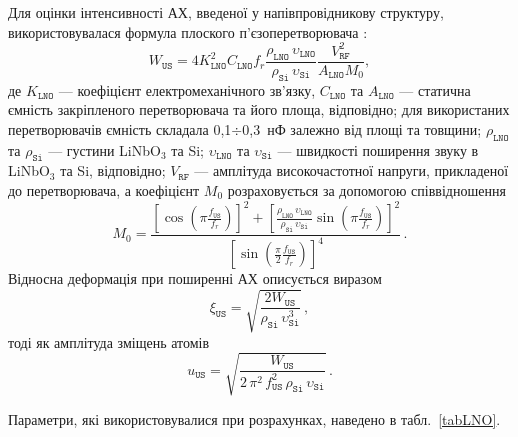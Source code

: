 Для оцінки інтенсивності АХ, введеної у напівпровідникову структуру, використовувалася формула плоского п’єзоперетворювача \cite{WusBook}:
 \begin{equation}
 \label{eqWus}
 W_\mathtt{US}=4K_\mathtt{LNO}^2C_\mathtt{LNO}f_r\frac{\rho_\mathtt{LNO}\,\upsilon_\mathtt{LNO}}{\rho_\mathtt{Si}\,\upsilon_\mathtt{Si}}\frac{V_\mathtt{RF}^2}{A_\mathtt{LNO}M_0},
 \end{equation}
де
$K_\mathtt{LNO}$ --- коефіцієнт електромеханічного зв'язку,
$C_\mathtt{LNO}$ та $A_\mathtt{LNO}$ --- статична ємність закріпленого перетворювача та його площа, відповідно;
для використаних перетворювачів ємність складала 0,1$\div$0,3~нФ залежно від площі та товщини;
$\rho_\mathtt{LNO}$ та $\rho_\mathtt{Si}$ --- густини LiNbO$_3$ та Si;
$\upsilon_\mathtt{LNO}$ та $\upsilon_\mathtt{Si}$ --- швидкості поширення звуку в LiNbO$_3$ та Si, відповідно;
$V_\mathtt{RF}$ --- амплітуда високочастотної напруги, прикладеної до перетворювача,
а коефіцієнт $M_0$ розраховується за допомогою співвідношення
 \begin{equation}
 \label{eqM0}
 M_0=\frac{\left[\cos\left(\pi\frac{f_\mathtt{US}}{f_r}\right)\right]^2+\left[\frac{\rho_\mathtt{LNO}\,\upsilon_\mathtt{LNO}}{\rho_\mathtt{Si}\,\upsilon_\mathtt{Si}}\sin\left(\pi\frac{f_\mathtt{US}}{f_r}\right)\right]^2}
 {\left[\sin\left(\frac{\pi}{2}\frac{f_\mathtt{US}}{f_r}\right)\right]^4}\,.
 \end{equation}
Відносна деформація при поширенні АХ описується виразом
 \begin{equation}
 \label{eqDefUS}
 \xi_{\mathtt{US}}=\sqrt{\frac{2W_\mathtt{US}}{\rho_\mathtt{Si}\,\upsilon_\mathtt{Si}^3}}\,,
 \end{equation}
тоді як амплітуда зміщень атомів
 \begin{equation}
 \label{eqAmpUS}
 u_{\mathtt{US}}=\sqrt{\frac{W_\mathtt{US}}{2\,\pi^2\,f_\mathtt{US}^2\,\rho_\mathtt{Si}\,\upsilon_\mathtt{Si}}}\,.
 \end{equation}

Параметри, які використовувалися при розрахунках, наведено в табл.~\ref{tabLNO}.


